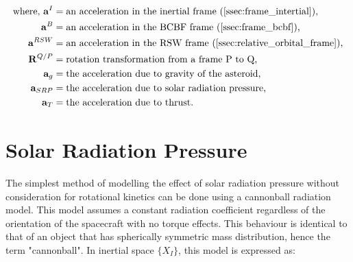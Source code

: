 \begin{equation*}
    \begin{aligned}
        \textrm{where, }
        \mathbf{a}^I &= \textrm{an acceleration in the inertial frame (\autoref{ssec:frame_intertial}),}\\
        \mathbf{a}^B &= \textrm{an acceleration in the BCBF frame (\autoref{ssec:frame_bcbf}),}\\
        \mathbf{a}^{RSW} &= \textrm{an acceleration in the RSW frame (\autoref{ssec:relative_orbital_frame}),}\\
        \mathbf{R}^{Q/P} &= \textrm{rotation transformation from a frame P to Q,}\\
        \mathbf{a}_g &= \textrm{the acceleration due to gravity of the asteroid,}\\
        \mathbf{a}_{SRP} &= \textrm{the acceleration due to solar radiation pressure,}\\
        \mathbf{a}_T &= \textrm{the acceleration due to thrust.}\\
    \end{aligned}
\end{equation*}


% 





\section{Solar Radiation Pressure}

The simplest method of modelling the effect of solar radiation pressure without consideration for rotational kinetics can be done using a cannonball radiation model. This model assumes a constant radiation coefficient regardless of the orientation of the spacecraft with no torque effects. This behaviour is identical to that of an object that has spherically symmetric mass distribution, hence the term "cannonball". In inertial space $\{X_I\}$, this model is expressed as:

